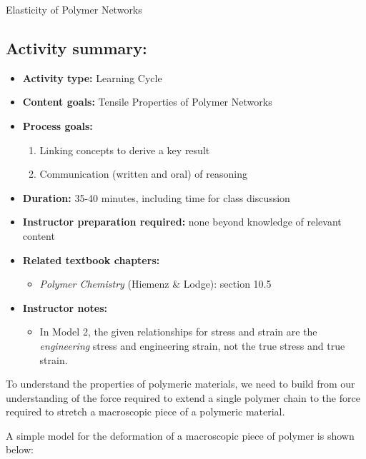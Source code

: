 \begin{activity}{Elasticity of Polymer Networks}
\begin{instructornotes}
	\subsection*{Activity summary:}
	\begin{itemize}
		\item \textbf{Activity type:} Learning Cycle
		\item \textbf{Content goals:} Tensile Properties of Polymer Networks
		\item \textbf{Process goals:} %
			\begin{enumerate}
				\item Linking concepts to derive a key result
				\item Communication (written and oral) of reasoning
			\end{enumerate}
		\item \textbf{Duration:} 35-40 minutes, including time for class discussion
		\item \textbf{Instructor preparation required:} none beyond knowledge of relevant content
		\item \textbf{Related textbook chapters:}
			\begin{itemize}
				\item \emph{Polymer Chemistry} (Hiemenz \& Lodge): section 10.5
			\end{itemize}
		\item \textbf{Instructor notes:}
			\begin{itemize}
				\item In Model 2, the given relationships for stress and strain are the \emph{engineering} stress and engineering strain, not the true stress and true strain.
			\end{itemize}
	\end{itemize}
	
\end{instructornotes}


\begin{model}
	\label{\labelbase:mdl:macrostretch}

	To understand the properties of polymeric materials, we need to build from our understanding of the force required to extend a single polymer chain to the force required to stretch a macroscopic piece of a polymeric material.
	
	A simple model for the deformation of a macroscopic piece of polymer is shown below:
	

\end{model}
\end{activity}
